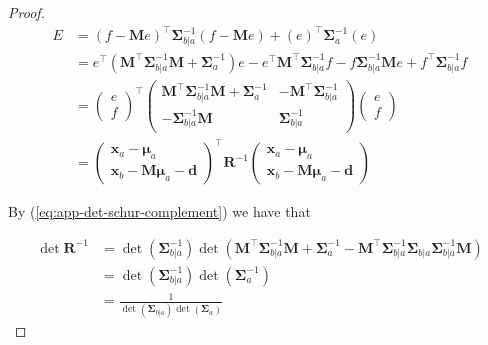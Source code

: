\begin{appendices}
\begin{proof}
    \begin{align}
      \label{eq:app-affine-transf-cov-matrix}
      E&=\left(f-\mathbf{M}e\right)^\top \boldsymbol{\Sigma}_{b | a}^{-1}\left(f-\mathbf{M}e\right)+\left(e\right)^\top \boldsymbol{\Sigma}_{a}^{-1}\left(e\right) \nonumber \\
      &= e^\top \left(\mathbf{M}^\top  \boldsymbol{\Sigma}_{b | a}^{-1} \mathbf{M}+\boldsymbol{\Sigma}_{a}^{-1}\right) e-e^\top  \mathbf{M}^\top  \boldsymbol{\Sigma}_{b | a}^{-1} f-f \boldsymbol{\Sigma}_{b | a}^{-1} \mathbf{M} e+f^\top  \boldsymbol{\Sigma}_{b | a}^{-1} f \nonumber \\
      &=\left(\begin{array}{c}{e} \\ {f}\end{array}\right)^\top \left(\begin{array}{cc}{\mathbf{M}^\top  \boldsymbol{\Sigma}_{b | a}^{-1} \mathbf{M}+\boldsymbol{\Sigma}_{a}^{-1}} & {-\mathbf{M}^\top  \boldsymbol{\Sigma}_{b | a}^{-1}} \\ {-\boldsymbol{\Sigma}_{b | a}^{-1} \mathbf{M}} & {\boldsymbol{\Sigma}_{b | a}^{-1}}\end{array}\right)\left(\begin{array}{l}{e} \\ {f}\end{array}\right) \nonumber  \\
      &= \left(\begin{array}{c}{\mathbf{x}_{a}-\boldsymbol{\mu}_{a}} \\ {\mathbf{x}_{b}-\mathbf{M} \boldsymbol{\mu}_{a}-\mathbf{d}}\end{array}\right)^\top \mathbf{R}^{-1}\left(\begin{array}{c}{\mathbf{x}_{a}-\boldsymbol{\mu}_{a}} \\ {\mathbf{x}_{b}-\mathbf{M} \boldsymbol{\mu}_{a}-\mathbf{d}}\end{array}\right)
    \end{align}

    By (\ref{eq:app-det-schur-complement}) we have that

    \begin{align}
      \det \mathbf{R}^{-1}&=\det\left(\boldsymbol{\Sigma}_{b | a}^{-1}\right) \det\left(\mathbf{M}^\top \boldsymbol{\Sigma}_{b | a}^{-1} \mathbf{M}+\boldsymbol{\Sigma}_{a}^{-1}-\mathbf{M}^\top \boldsymbol{\Sigma}_{b | a}^{-1} \boldsymbol{\Sigma}_{b | a} \boldsymbol{\Sigma}_{b | a}^{-1} \mathbf{M}\right) \nonumber  \\
      &=\det\left(\boldsymbol{\Sigma}_{b | a}^{-1}\right) \det\left(\boldsymbol{\Sigma}_{a}^{-1}\right) \nonumber  \\
      &=\frac{1}{\det\left(\boldsymbol{\Sigma}_{b | a}\right) \det\left(\boldsymbol{\Sigma}_{a}\right)}
    \end{align}
    

\end{proof}
\end{appendices}
